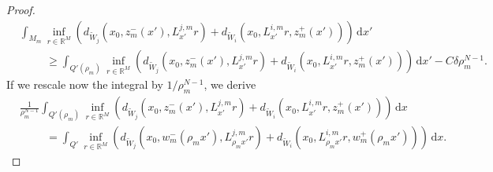 \documentclass[a4paper, 11pt, reqno]{amsart}
\theoremstyle{plain}
\theoremstyle{definition}
\theoremstyle{remark}
\newcommand{\R}{\mathbb R}
\begin{document}
\begin{proof}
\begin{align}
        &\int_{M_m} \inf_{r \in \R^M} \left( d_{\widetilde W_j}(x_0, z_m^-(x'), L^{j,m}_{x'}r) + d_{\widetilde W_i}(x_0, L^{i,m}_{x'}r, z_m^+(x')) \right) \, \mathrm{d}x' \nonumber \\
        & \hspace{1cm} \geq \int_{Q'(\rho_m)} \inf_{r \in \R^M} \left( d_{\widetilde W_j}(x_0, z_m^-(x'), L^{j,m}_{x'}r) + d_{\widetilde W_i}(x_0, L^{i,m}_{x'}r, z_m^+(x')) \right) \, \mathrm{d}x' - C\delta\rho_m^{N-1}.
    \end{align}
    If we rescale now the integral by $1/\rho_m^{N-1}$, we derive 
    \begin{align}\label{eq:liminf_partial_inequality_9}
        &\frac{1}{\rho_m^{N-1}}\int_{Q'(\rho_m)} \inf_{r \in \R^M} \left( d_{\widetilde W_j}(x_0, z_m^-(x'), L^{j,m}_{x'}r) + d_{\widetilde W_i}(x_0, L^{i,m}_{x'}r, z_m^+(x')) \right) \, \mathrm{d}x \nonumber \\
        & \hspace{1cm} = \int_{Q'} \inf_{r \in \R^M} \left( d_{\widetilde W_j}(x_0, w_m^-(\rho_m x'), L^{j,m}_{\rho_m x'}r) + d_{\widetilde W_i}(x_0, L^{i,m}_{\rho_m x'}r, w_m^+(\rho_m x')) \right) \, \mathrm{d}x. 
    \end{align}


\end{proof}
\end{document}
